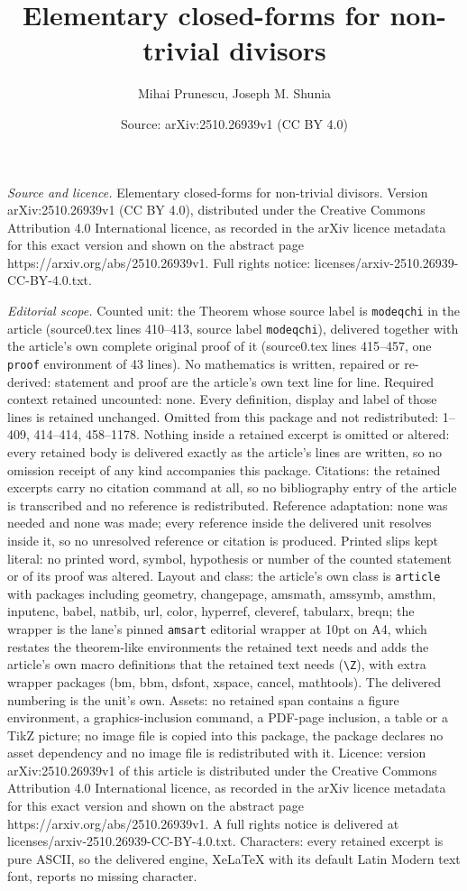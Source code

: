 \documentclass[10pt,a4paper]{amsart}
\title[Elementary closed-forms for non-trivial divisors]{Elementary closed-forms for non-trivial divisors}
\author{Mihai Prunescu, Joseph M. Shunia}
\date{Source: arXiv:2510.26939v1 (CC BY 4.0)}
\begin{document}
\maketitle

\noindent\emph{Source and licence.} Elementary closed-forms for non-trivial divisors. Version arXiv:2510.26939v1 (CC BY 4.0), distributed under the Creative Commons Attribution 4.0 International licence, as recorded in the arXiv licence metadata for this exact version and shown on the abstract page https://arxiv.org/abs/2510.26939v1. Full rights notice: licenses/arxiv-2510.26939-CC-BY-4.0.txt.\par\smallskip

\noindent\textit{Editorial scope.} Counted unit: the Theorem whose source label is \texttt{modeqchi} in the article (source0.tex lines 410--413, source label \texttt{modeqchi}), delivered together with the article's own complete original proof of it (source0.tex lines 415--457, one \texttt{proof} environment of 43 lines). No mathematics is written, repaired or re-derived: statement and proof are the article's own text line for line. Required context retained uncounted: none. Every definition, display and label of those lines is retained unchanged. Omitted from this package and not redistributed: 1--409, 414--414, 458--1178. Nothing inside a retained excerpt is omitted or altered: every retained body is delivered exactly as the article's lines are written, so no omission receipt of any kind accompanies this package. Citations: the retained excerpts carry no citation command at all, so no bibliography entry of the article is transcribed and no reference is redistributed. Reference adaptation: none was needed and none was made; every reference inside the delivered unit resolves inside it, so no unresolved reference or citation is produced. Printed slips kept literal: no printed word, symbol, hypothesis or number of the counted statement or of its proof was altered. Layout and class: the article's own class is \texttt{article} with packages including geometry, changepage, amsmath, amssymb, amsthm, inputenc, babel, natbib, url, color, hyperref, cleveref, tabularx, breqn; the wrapper is the lane's pinned \texttt{amsart} editorial wrapper at 10pt on A4, which restates the theorem-like environments the retained text needs and adds the article's own macro definitions that the retained text needs (\texttt{\textbackslash Z}), with extra wrapper packages (bm, bbm, dsfont, xspace, cancel, mathtools). The delivered numbering is the unit's own. Assets: no retained span contains a figure environment, a graphics-inclusion command, a PDF-page inclusion, a table or a TikZ picture; no image file is copied into this package, the package declares no asset dependency and no image file is redistributed with it. Licence: version arXiv:2510.26939v1 of this article is distributed under the Creative Commons Attribution 4.0 International licence, as recorded in the arXiv licence metadata for this exact version and shown on the abstract page https://arxiv.org/abs/2510.26939v1. A full rights notice is delivered at licenses/arxiv-2510.26939-CC-BY-4.0.txt. Characters: every retained excerpt is pure ASCII, so the delivered engine, XeLaTeX with its default Latin Modern text font, reports no missing character.
\end{document}
